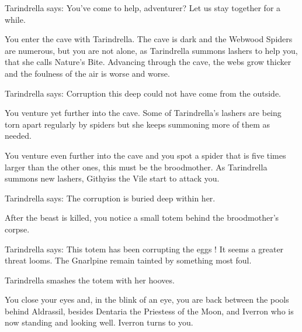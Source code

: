 Tarindrella says: You've come to help, adventurer? Let us stay together for a while.



You enter the cave with Tarindrella. The cave is dark and the Webwood Spiders are numerous, but you are not alone, as Tarindrella summons lashers to help you, that she calls Nature's Bite. Advancing through the cave, the webs grow thicker and the foulness of the air is worse and worse. %

Tarindrella says: Corruption this deep could not have come from the outside.

You venture yet further into the cave. Some of Tarindrella's lashers are being torn apart regularly by spiders but she keeps summoning more of them as needed.



You venture even further into the cave and you spot a spider that is five times larger than the other ones, this must be the broodmother. As Tarindrella summons new lashers, Githyiss the Vile start to attack you.

Tarindrella says: The corruption is buried deep within her.

After the beast is killed, you notice a small totem behind the broodmother's corpse.

Tarindrella says: This totem has been corrupting the eggs ! It seems a greater threat looms. The Gnarlpine remain tainted by something most foul.


Tarindrella smashes the totem with her hooves.


You close your eyes and, in the blink of an eye, you are back between the pools behind Aldrassil, besides Dentaria the Priestess of the Moon, and Iverron who is now standing and looking well. Iverron turns to you.

